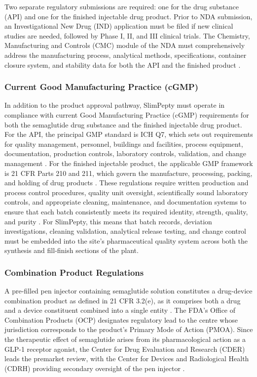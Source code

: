 Two separate regulatory submissions are required: one for the drug substance (API) and one for the finished injectable drug product. Prior to NDA submission, an Investigational New Drug (IND) application must be filed if new clinical studies are needed, followed by Phase I, II, and III clinical trials. The Chemistry, Manufacturing and Controls (CMC) module of the NDA must comprehensively address the manufacturing process, analytical methods, specifications, container closure system, and stability data for both the API and the finished product \cite{Vici_505b}.

\subsubsection{Current Good Manufacturing Practice (cGMP)}

In addition to the product approval pathway, SlimPepty must operate in compliance with current Good Manufacturing Practice (cGMP) requirements for both the semaglutide drug substance and the finished injectable drug product. For the API, the principal GMP standard is ICH Q7, which sets out requirements for quality management, personnel, buildings and facilities, process equipment, documentation, production controls, laboratory controls, validation, and change management \cite{FDA_Q7}. For the finished injectable product, the applicable GMP framework is 21 CFR Parts 210 and 211, which govern the manufacture, processing, packing, and holding of drug products \cite{FDA_cGMP}. These regulations require written production and process control procedures, quality unit oversight, scientifically sound laboratory controls, and appropriate cleaning, maintenance, and documentation systems to ensure that each batch consistently meets its required identity, strength, quality, and purity \cite{eCFR_211}. For SlimPepty, this means that batch records, deviation investigations, cleaning validation, analytical release testing, and change control must be embedded into the site's pharmaceutical quality system across both the synthesis and fill-finish sections of the plant.

\subsubsection{Combination Product Regulations}

A pre-filled pen injector containing semaglutide solution constitutes a drug-device combination product as defined in 21 CFR 3.2(e), as it comprises both a drug and a device constituent combined into a single entity \cite{FDA_ComboGMP_2017}. The FDA's Office of Combination Products (OCP) designates regulatory lead to the centre whose jurisdiction corresponds to the product's Primary Mode of Action (PMOA). Since the therapeutic effect of semaglutide arises from its pharmacological action as a GLP-1 receptor agonist, the Center for Drug Evaluation and Research (CDER) leads the premarket review, with the Center for Devices and Radiological Health (CDRH) providing secondary oversight of the pen injector \cite{Latoz_2023}.

